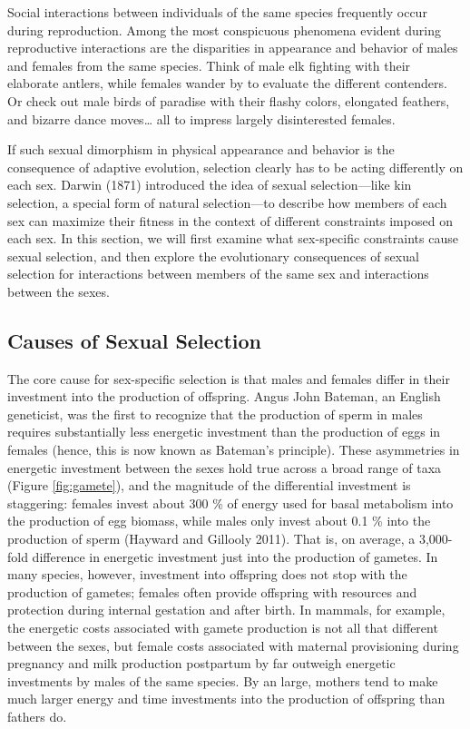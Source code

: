 \documentclass[
]{book}
\begin{document}
Social interactions between individuals of the same species frequently occur during reproduction. Among the most conspicuous phenomena evident during reproductive interactions are the disparities in appearance and behavior of males and females from the same species. Think of male elk fighting with their elaborate antlers, while females wander by to evaluate the different contenders. Or check out male birds of paradise with their flashy colors, elongated feathers, and bizarre dance moves\ldots{} all to impress largely disinterested females.

If such sexual dimorphism in physical appearance and behavior is the consequence of adaptive evolution, selection clearly has to be acting differently on each sex. Darwin (1871) introduced the idea of sexual selection---like kin selection, a special form of natural selection---to describe how members of each sex can maximize their fitness in the context of different constraints imposed on each sex. In this section, we will first examine what sex-specific constraints cause sexual selection, and then explore the evolutionary consequences of sexual selection for interactions between members of the same sex and interactions between the sexes.

\hypertarget{causes-of-sexual-selection}{%
\subsection{Causes of Sexual Selection}\label{causes-of-sexual-selection}}

The core cause for sex-specific selection is that males and females differ in their investment into the production of offspring. Angus John Bateman, an English geneticist, was the first to recognize that the production of sperm in males requires substantially less energetic investment than the production of eggs in females (hence, this is now known as Bateman's principle). These asymmetries in energetic investment between the sexes hold true across a broad range of taxa (Figure \ref{fig:gamete}), and the magnitude of the differential investment is staggering: females invest about 300 \% of energy used for basal metabolism into the production of egg biomass, while males only invest about 0.1 \% into the production of sperm (Hayward and Gillooly 2011). That is, on average, a 3,000-fold difference in energetic investment just into the production of gametes. In many species, however, investment into offspring does not stop with the production of gametes; females often provide offspring with resources and protection during internal gestation and after birth. In mammals, for example, the energetic costs associated with gamete production is not all that different between the sexes, but female costs associated with maternal provisioning during pregnancy and milk production postpartum by far outweigh energetic investments by males of the same species. By an large, mothers tend to make much larger energy and time investments into the production of offspring than fathers do.
\end{document}
